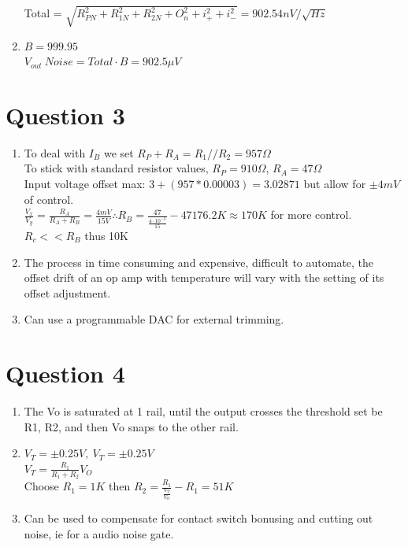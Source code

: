 \documentclass[11pt]{article}
\begin{document}
\begin{preview}
\begin{enumerate}[label=\roman*)]
                Total = $\sqrt{R_{PN}^{2}+R_{1N}^{2}+R_{2N}^{2}+O_{n}^{2}+i_{+}^{2}+i_{-}^{2}} = 902.54nV/\sqrt{Hz}$

        \item   $B = 999.95$\\
                $V_{out}\:Noise = Total{\cdot}B = 902.5\mu V$
\end{enumerate}
\section*{Question 3}
\begin{enumerate}[label=\roman*)]
        \item To deal with $I_B$ we set $R_P + R_A = R_1 // R_2 = 957\Omega$\\
        To stick with standard resistor values, $R_P = 910\Omega$, $R_A = 47\Omega$\\
        Input voltage offset max: $3+(957*0.00003)=3.02871$ but allow for $\pm4mV$ of control.\\
        $\frac{V_x}{V_y} = \frac{R_A}{R_A+R_B} = \frac{4mV}{15V} \therefore R_B = \frac{47}{\frac{4\cdot10^{-3}}{15}}-47 176.2K \approx 170K$ for more control. \\
        $R_c << R_B$ thus 10K

        \item The process in time consuming and expensive, difficult to automate, the offset drift of an op amp with temperature will vary with the
        setting of its offset adjustment.

        \item Can use a programmable DAC for external trimming.
\end{enumerate}
\section*{Question 4}
\begin{enumerate}[label=\roman*)]
        \item The Vo is saturated at 1 rail, until the output crosses the threshold set be R1, R2, and then Vo snaps to the other rail.   

        \item $V_{T}=\pm0.25V,\:V_{T}=\pm0.25V$\\
        $V_T = \frac{R_1}{R_1+R_2}V_O$\\
        Choose $R_1=1K$ then $R_2=\frac{R_{1}}{\frac{V_{T}}{V_{O}}}-R_{1} = 51K$

        \item Can be used to compensate for contact switch bonusing and cutting out noise, ie for a audio noise gate. 
\end{enumerate}

\end{preview}
\end{document}
